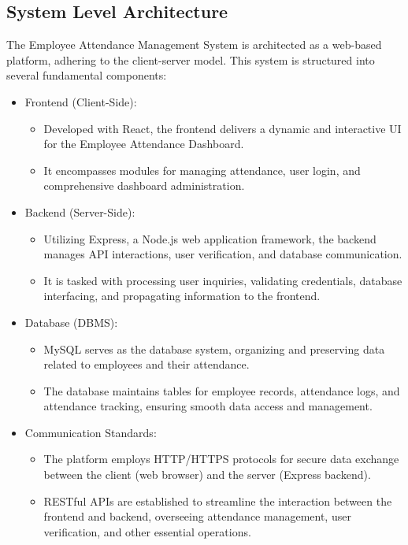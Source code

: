 \documentclass[a4paper, 12pt]{article}
\begin{document}
\subsection{System Level Architecture}
The Employee Attendance Management System is architected as a web-based platform, adhering to the client-server model. This system is structured into several fundamental components:
\begin{itemize}
    \item Frontend (Client-Side):
    \begin{itemize}
        \item Developed with React, the frontend delivers a dynamic and interactive UI for the Employee Attendance Dashboard.
        \item It encompasses modules for managing attendance, user login, and comprehensive dashboard administration.
    \end{itemize}
    \item Backend (Server-Side):
    \begin{itemize}
        \item Utilizing Express, a Node.js web application framework, the backend manages API interactions, user verification, and database communication.
        \item It is tasked with processing user inquiries, validating credentials, database interfacing, and propagating information to the frontend.
    \end{itemize}
    \item Database (DBMS):
    \begin{itemize}
        \item MySQL serves as the database system, organizing and preserving data related to employees and their attendance.
        \item The database maintains tables for employee records, attendance logs, and attendance tracking, ensuring smooth data access and management.
    \end{itemize}
    \item Communication Standards:
    \begin{itemize}
        \item The platform employs HTTP/HTTPS protocols for secure data exchange between the client (web browser) and the server (Express backend).
        \item RESTful APIs are established to streamline the interaction between the frontend and backend, overseeing attendance management, user verification, and other essential operations.
    \end{itemize}
\end{itemize}
\end{document}
